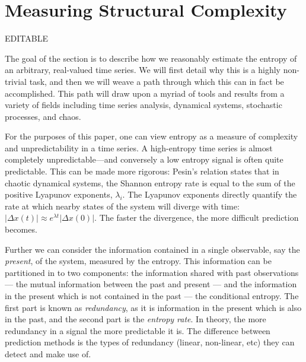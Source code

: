 \section{Measuring Structural Complexity }\label{sec:meaComplex}
{\color{blue} EDITABLE}

The goal of the section is to describe how we reasonably estimate the entropy of an arbitrary, real-valued time series. We will first detail why this is a highly non-trivial task, and then we will weave a path through which this can in fact be accomplished. This path will draw upon a myriad of tools and results from a variety of fields including time series analysis, dynamical systems, stochastic processes, and chaos.

For the purposes of this paper, one can view entropy as a measure of complexity and unpredictability in a time series.  A high-entropy time series is almost completely unpredictable---and conversely a low entropy signal is often quite predictable.  This can be made more rigorous: Pesin's relation \cite{pesin77} states that in chaotic dynamical systems, the Shannon entropy rate is equal to the sum of the positive Lyapunov exponents, $\lambda_i$. The Lyapunov exponents directly quantify the rate at which nearby states of the system will diverge with time: $\left| \Delta x(t) \right| \approx e^{\lambda t} \left| \Delta x(0) \right|$.  The faster the divergence, the more difficult prediction becomes.

Further we can consider the information contained in a single observable, say the \emph{present}, of the system, measured by the entropy. This information can be partitioned in to two components: the information shared with past observations --- the mutual information between the past and present --- and the information in the present which is not contained in the past --- the conditional entropy. The first part is known as \emph{redundancy}, as it is information in the present which is also in the past, and the second part is the \emph{entropy rate}. In theory, the more redundancy in a signal the more predictable it is. The difference between prediction methods is the types of redundancy (linear, non-linear, etc) they can detect and make use of.

